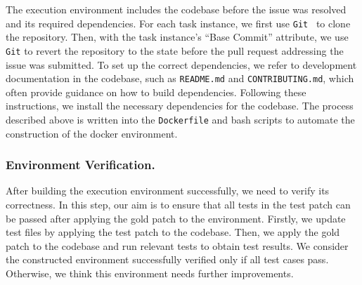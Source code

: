 The execution environment includes the codebase before the issue was resolved and its required dependencies. For each task instance, we first use \texttt{Git}~\cite{git} to clone the repository. Then, with the task instance's ``Base Commit'' attribute, we use \texttt{Git} to revert the repository to the state before the pull request addressing the issue was submitted. To set up the correct dependencies, we refer to development documentation in the codebase, such as \texttt{README.md} and \texttt{CONTRIBUTING.md}, which often provide guidance on how to build dependencies. Following these instructions, we install the necessary dependencies for the codebase. The process described above is written into the \texttt{Dockerfile} and bash scripts to automate the construction of the docker environment.




\subsubsection{Environment Verification.}After building the execution environment successfully, we need to verify its correctness. In this step, our aim is to ensure that all tests in the test patch can be passed after applying the gold patch to the environment. Firstly, we update test files by applying the test patch to the codebase. Then, we apply the gold patch to the codebase and run relevant tests to obtain test results. We consider the constructed environment successfully verified only if all test cases pass. Otherwise, we think this environment needs further improvements.
